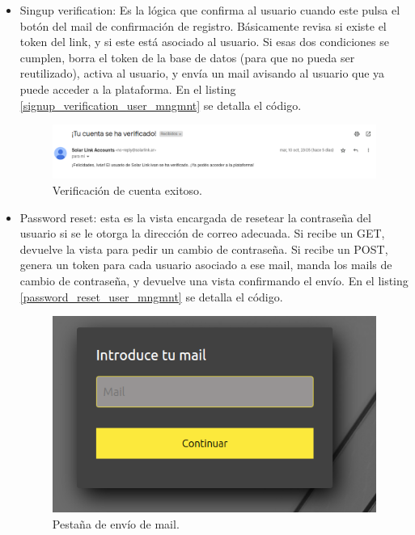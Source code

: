 \begin{itemize}
    \item Singup verification: Es la lógica que confirma al usuario cuando este pulsa el botón del mail de confirmación de registro. Básicamente revisa si existe el token del link, y si este está asociado al usuario. Si esas dos condiciones se cumplen, borra el token de la base de datos (para que no pueda ser reutilizado), activa al usuario, y envía un mail avisando al usuario que ya puede acceder a la plataforma. En el listing \ref{signup_verification_user_mngmnt} se detalla el código.

\begin{figure}[H]
    \centering
    \includegraphics[width=1\linewidth]{web/Captura desde 2023-10-15 23-38-55.png}
    \caption{Verificación de cuenta exitoso.}
    \label{fig:mail-verify-ok}
\end{figure}
    
    \item Password reset: esta es la vista encargada de resetear la contraseña del usuario si se le otorga la dirección de correo adecuada. Si recibe un GET, devuelve la vista para pedir un cambio de contraseña. Si recibe un POST, genera un token para cada usuario asociado a ese mail, manda los mails de cambio de contraseña, y devuelve una vista confirmando el envío. En el listing \ref{password_reset_user_mngmnt} se detalla el código.

\begin{figure}[H]
    \centering
    \includegraphics[width=0.7\linewidth]{web/Captura desde 2023-10-15 23-44-54.png}
    \caption{Pestaña de envío de mail.}
    \label{fig:introducir-mail}
\end{figure}


\end{itemize}
